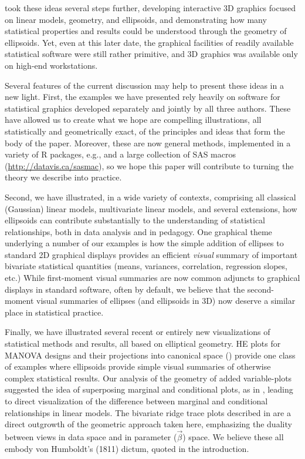 \citet{Monette:90}
took these ideas several steps further, developing interactive 3D graphics focused on linear
models, geometry, and ellipsoids, and demonstrating how many statistical properties
and results could be understood through the geometry of ellipsoids.  Yet, even at this
later date, the graphical facilities of readily available statistical software were still
rather primitive, and 3D graphics was available only on high-end workstations.


Several features of the current discussion may help to present these ideas in a
new light.  First, the examples we have presented rely heavily on software for
statistical graphics developed separately and jointly by all three authors.
These have allowed us to create what we hope are compelling illustrations,
all statistically and geometrically exact, of the principles and ideas that
form the body of the paper.  Moreover, these are now general methods, implemented
in a variety of R packages, e.g.,
\citep{FoxWeisberg:2011,Friendly:07:manova}
and a large collection of SAS macros (\url{http://datavis.ca/sasmac}),
so we hope this paper will contribute to turning the theory we describe
into practice.

Second, we have illustrated, in a wide variety of contexts,
comprising all classical (Gaussian) linear models, multivariate linear models,
and several extensions,
how ellipsoids can contribute substantially to the understanding of statistical
relationships, both in data analysis and in pedagogy.  One graphical theme underlying
a number of our examples is how the simple addition of ellipses to standard 2D graphical
displays provides an efficient \emph{visual} summary of important bivariate
statistical quantities (means, variances, correlation, regression slopes, etc.)
While first-moment visual summaries are now common adjuncts to graphical displays
in standard software, often by default, we believe that the second-moment visual summaries
of ellipses (and ellipsoids in 3D)
now deserve a similar place in statistical practice.

Finally, we have illustrated several recent or entirely new visualizations of
statistical methods and results, all based on elliptical geometry.
HE plots for MANOVA designs \citep{Friendly:07:manova}
and their projections into canonical space ()
provide one class of examples where ellipsoids provide simple visual summaries of
otherwise complex statistical results.
Our analysis of the geometry of added variable-plots suggested the idea of superposing
marginal and conditional plots, as in , leading to
direct visualization of the difference between marginal and conditional relationships
in linear models.
The bivariate ridge trace plots described in  are a direct outgrowth
of the geometric approach taken here, emphasizing the duality between views in data
space and in parameter ($\vec{\beta}$) space.
We believe these all embody von Humboldt's (1811) dictum, quoted in the introduction.





